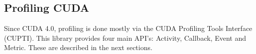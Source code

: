 \subsection{Profiling CUDA}
\label{sec:cuda:prof}

Since CUDA 4.0, profiling is done mostly via the CUDA Profiling Tools Interface (CUPTI). This library provides four main API's: Activity, Callback, Event and Metric. These are described in the next sections.





